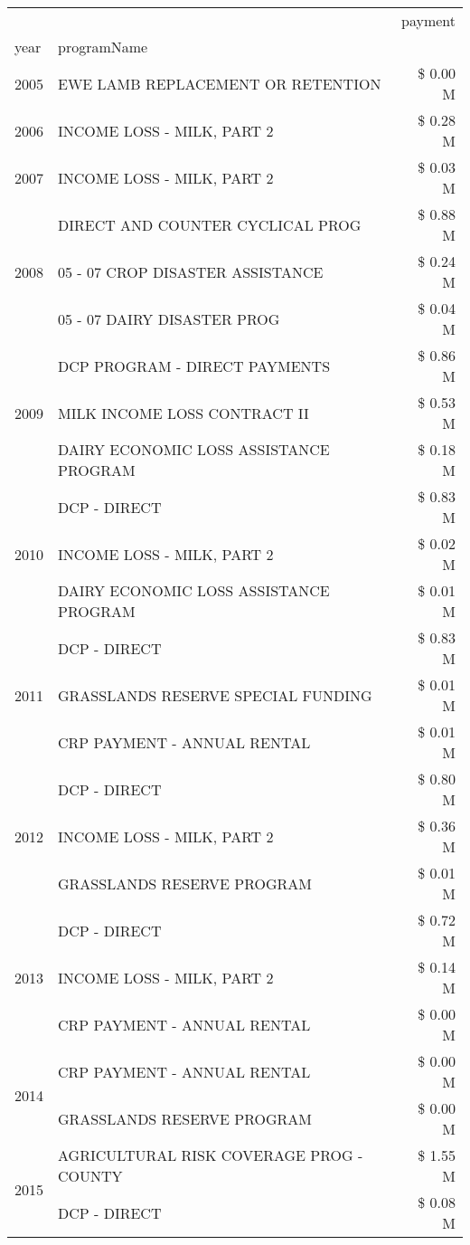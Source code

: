 \begin{tabular}{llr}
\toprule
 &  & payment \\
year & programName &  \\
\midrule
2005 & EWE LAMB REPLACEMENT OR RETENTION & \$ 0.00 M \\
\cline{1-3}
2006 & INCOME LOSS - MILK, PART 2 & \$ 0.28 M \\
\cline{1-3}
2007 & INCOME LOSS - MILK, PART 2 & \$ 0.03 M \\
\cline{1-3}
\multirow[t]{3}{*}{2008} & DIRECT AND COUNTER CYCLICAL PROG & \$ 0.88 M \\
 & 05 - 07 CROP DISASTER ASSISTANCE & \$ 0.24 M \\
 & 05 - 07 DAIRY DISASTER PROG & \$ 0.04 M \\
\cline{1-3}
\multirow[t]{3}{*}{2009} & DCP PROGRAM - DIRECT PAYMENTS & \$ 0.86 M \\
 & MILK INCOME LOSS CONTRACT II & \$ 0.53 M \\
 & DAIRY ECONOMIC LOSS ASSISTANCE PROGRAM & \$ 0.18 M \\
\cline{1-3}
\multirow[t]{3}{*}{2010} & DCP - DIRECT & \$ 0.83 M \\
 & INCOME LOSS - MILK, PART 2 & \$ 0.02 M \\
 & DAIRY ECONOMIC LOSS ASSISTANCE PROGRAM & \$ 0.01 M \\
\cline{1-3}
\multirow[t]{3}{*}{2011} & DCP - DIRECT & \$ 0.83 M \\
 & GRASSLANDS RESERVE SPECIAL FUNDING & \$ 0.01 M \\
 & CRP PAYMENT - ANNUAL RENTAL & \$ 0.01 M \\
\cline{1-3}
\multirow[t]{3}{*}{2012} & DCP - DIRECT & \$ 0.80 M \\
 & INCOME LOSS - MILK, PART 2 & \$ 0.36 M \\
 & GRASSLANDS RESERVE PROGRAM & \$ 0.01 M \\
\cline{1-3}
\multirow[t]{3}{*}{2013} & DCP - DIRECT & \$ 0.72 M \\
 & INCOME LOSS - MILK, PART 2 & \$ 0.14 M \\
 & CRP PAYMENT - ANNUAL RENTAL & \$ 0.00 M \\
\cline{1-3}
\multirow[t]{2}{*}{2014} & CRP PAYMENT - ANNUAL RENTAL & \$ 0.00 M \\
 & GRASSLANDS RESERVE PROGRAM & \$ 0.00 M \\
\cline{1-3}
\multirow[t]{3}{*}{2015} & AGRICULTURAL RISK COVERAGE PROG - COUNTY & \$ 1.55 M \\
 & DCP - DIRECT & \$ 0.08 M \\

\end{tabular}
